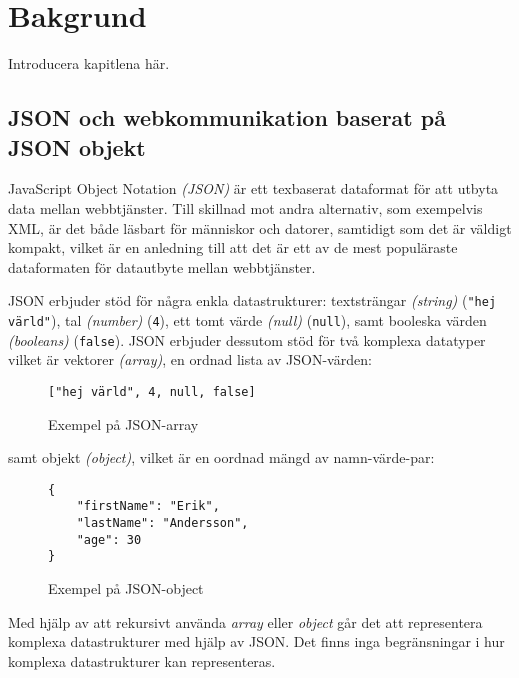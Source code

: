 \documentclass[swedish]{kththesis}
\begin{document}

\section{Bakgrund}
Introducera kapitlena här.

\subsection{JSON och webkommunikation baserat på JSON objekt}
\label{sec:intr:bakgrund:json}
JavaScript Object Notation \textit{(JSON)} är ett texbaserat dataformat för att utbyta data mellan webbtjänster. Till skillnad mot andra alternativ, som exempelvis XML, är det både läsbart för människor och datorer, samtidigt som det är väldigt kompakt, vilket är en anledning till att det är ett av de mest populäraste dataformaten för datautbyte mellan webbtjänster. \cite{Pezoa2016} 

JSON erbjuder stöd för några enkla datastrukturer: textsträngar \textit{(string)} (\texttt{"hej värld"}), tal \textit{(number)} (\texttt{4}), ett tomt värde \textit{(null)} (\texttt{null}), samt booleska värden \textit{(booleans)} (\texttt{false}). JSON erbjuder dessutom stöd för två komplexa datatyper vilket är vektorer \textit{(array)}, en ordnad lista av JSON-värden:

\begin{figure}[h]
	\begin{verbatim}
["hej värld", 4, null, false]
	\end{verbatim}
	\vspace{-1.5em}
	\caption{Exempel på JSON-array}
\end{figure}

\noindent
samt objekt \textit{(object)}, vilket är en oordnad mängd av namn-värde-par:

\begin{figure}[h]
	\begin{verbatim}
{
	"firstName": "Erik",
	"lastName": "Andersson",
	"age": 30
}
	\end{verbatim}
	\vspace{-1.5em}
	\caption{Exempel på JSON-object}
	\label{fig:json-object-example}
\end{figure}

\noindent
Med hjälp av att rekursivt använda \textit{array} eller \textit{object} går det att representera komplexa datastrukturer med hjälp av JSON. Det finns inga begränsningar i hur komplexa datastrukturer kan representeras.
\end{document}
